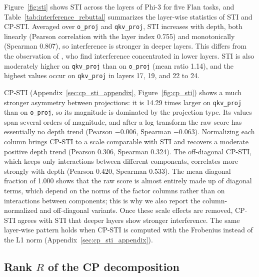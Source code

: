 \documentclass[10pt]{article} %
\begin{document}
Figure~\ref{fig:sti} shows STI across the layers of Phi-3 for five Flan tasks, and Table~\ref{tab:interference_rebuttal} summarizes the layer-wise statistics of STI and CP-STI. Averaged over \texttt{o\_proj} and \texttt{qkv\_proj}, STI increases with depth, both linearly (Pearson correlation with the layer index 0.755) and monotonically (Spearman 0.807), so interference is stronger in deeper layers. This differs from the observation of \citet{gargiulo2025task}, who find interference concentrated in lower layers. STI is also moderately higher on \texttt{qkv\_proj} than on \texttt{o\_proj} (mean ratio 1.14), and the highest values occur on \texttt{qkv\_proj} in layers 17, 19, and 22 to 24.

CP-STI (Appendix~\ref{sec:cp_sti_appendix}, Figure~\ref{fig:cp_sti}) shows a much stronger asymmetry between projections: it is 14.29 times larger on \texttt{qkv\_proj} than on \texttt{o\_proj}, so its magnitude is dominated by the projection type. Its values span several orders of magnitude, and after a log transform the raw score has essentially no depth trend (Pearson $-0.006$, Spearman $-0.063$). Normalizing each column brings CP-STI to a scale comparable with STI and recovers a moderate positive depth trend (Pearson 0.306, Spearman 0.324). The off-diagonal CP-STI, which keeps only interactions between different components, correlates more strongly with depth (Pearson 0.420, Spearman 0.533). The mean diagonal fraction of 1.000 shows that the raw score is almost entirely made up of diagonal terms, which depend on the norms of the factor columns rather than on interactions between components; this is why we also report the column-normalized and off-diagonal variants. Once these scale effects are removed, CP-STI agrees with STI that deeper layers show stronger interference. The same layer-wise pattern holds when CP-STI is computed with the Frobenius instead of the L1 norm (Appendix~\ref{sec:cp_sti_appendix}).






\subsection{Rank $R$ of the CP decomposition}
\label{sec:rank_analyse}
\end{document}
